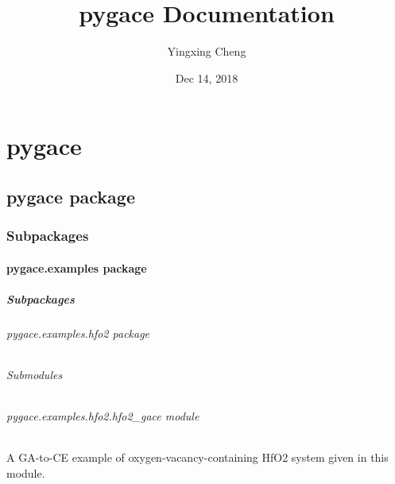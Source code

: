 \documentclass[letterpaper,10pt,english]{sphinxmanual}
\title{pygace Documentation}
\date{Dec 14, 2018}
\author{Yingxing Cheng}
\begin{document}
\maketitle
\sphinxtableofcontents
{}\label{\detokenize{index::doc}}



\chapter{pygace}
\label{\detokenize{modules::doc}}\label{\detokenize{modules:welcome-to-pygace-s-documentation}}\label{\detokenize{modules:pygace}}

\section{pygace package}
\label{\detokenize{pygace:pygace-package}}\label{\detokenize{pygace::doc}}

\subsection{Subpackages}
\label{\detokenize{pygace:subpackages}}

\subsubsection{pygace.examples package}
\label{\detokenize{pygace.examples::doc}}\label{\detokenize{pygace.examples:pygace-examples-package}}

\paragraph{Subpackages}
\label{\detokenize{pygace.examples:subpackages}}

\subparagraph{pygace.examples.hfo2 package}
\label{\detokenize{pygace.examples.hfo2::doc}}\label{\detokenize{pygace.examples.hfo2:pygace-examples-hfo2-package}}

\subparagraph{Submodules}
\label{\detokenize{pygace.examples.hfo2:submodules}}

\subparagraph{pygace.examples.hfo2.hfo2\_gace module}
\label{\detokenize{pygace.examples.hfo2:pygace-examples-hfo2-hfo2-gace-module}}\label{\detokenize{pygace.examples.hfo2:module-pygace.examples.hfo2.hfo2_gace}}
A GA-to-CE example of oxygen-vacancy-containing HfO2 system given in
this module.
\end{document}
